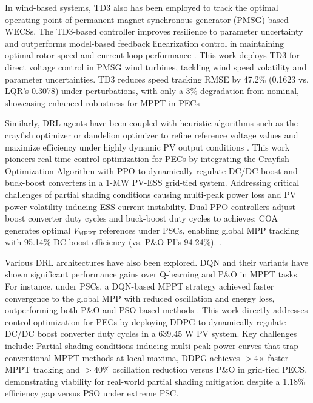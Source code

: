 In wind-based systems, TD3 also has been employed to track the optimal operating point of permanent magnet synchronous generator (PMSG)-based WECSs. The TD3-based controller improves resilience to parameter uncertainty and outperforms model-based feedback linearization control in maintaining optimal rotor speed and current loop performance \cite{zholtayev2024deep}. This work deploys TD3 for direct voltage control in PMSG wind turbines, tackling wind speed volatility and parameter uncertainties. TD3 reduces speed tracking RMSE by 47.2\% (0.1623 vs. LQR's 0.3078) under perturbations, with only a 3\% degradation from nominal, showcasing enhanced robustness for MPPT in PECs

Similarly, DRL agents have been coupled with heuristic algorithms such as the crayfish optimizer or dandelion optimizer to refine reference voltage values and maximize efficiency under highly dynamic PV output conditions \cite{ghazi2024maximum}. This work pioneers real-time control optimization for PECs by integrating the Crayfish Optimization Algorithm with PPO to dynamically regulate DC/DC boost and buck-boost converters in a 1-MW PV-ESS grid-tied system. Addressing critical challenges of partial shading conditions causing multi-peak power loss and PV power volatility inducing ESS current instability. Dual PPO controllers adjust boost converter duty cycles and buck-boost duty cycles to achieves: COA generates optimal $V_\text{MPPT}$ references under PSCs, enabling global MPP tracking with 95.14\% DC boost efficiency (vs. P\&O-PI's 94.24\%).  .

Various DRL architectures have also been explored. DQN and their variants have shown significant performance gains over Q-learning and P\&O in MPPT tasks. For instance, under PSCs, a DQN-based MPPT strategy achieved faster convergence to the global MPP with reduced oscillation and energy loss, outperforming both P\&O and PSO-based methods \cite{yew2023investigating}. This work directly addresses control optimization for PECs by deploying DDPG to dynamically regulate DC/DC boost converter duty cycles in a 639.45 W PV system. Key challenges include: Partial shading conditions inducing multi-peak power curves that trap conventional MPPT methods at local maxima, DDPG achieves $>$4$\times$ faster MPPT tracking and $>$40\% oscillation reduction versus P\&O in grid-tied PECS, demonstrating viability for real-world partial shading mitigation despite a 1.18\% efficiency gap versus PSO under extreme PSC.

